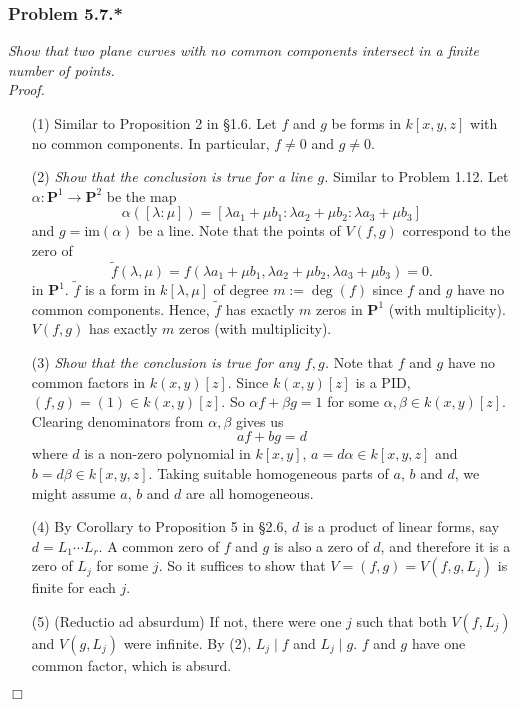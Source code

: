\documentclass{article}
\begin{document}



\subsubsection*{Problem 5.7.*}
\emph{Show that two plane curves with no common components intersect in
a finite number of points.} \\



\emph{Proof.}
\begin{enumerate}
\item[(1)]
  Similar to Proposition 2 in \S 1.6.
  Let $f$ and $g$ be forms in $k[x,y,z]$ with no common components.
  In particular, $f \neq 0$ and $g \neq 0$.

\item[(2)]
  \emph{Show that the conclusion is true for a line $g$.}
  Similar to Problem 1.12.
  Let
  $\alpha: \mathbf{P}^1 \to \mathbf{P}^2$ be the map
  \[
    \alpha([\lambda : \mu]) = [\lambda a_1 + \mu b_1 : \lambda a_2 + \mu b_2 : \lambda a_3 + \mu b_3]
  \]
  and $g = \mathrm{im}(\alpha)$ be a line.
  Note that the points of $V(f, g)$ correspond to the zero of
  \[
    \widetilde{f}(\lambda, \mu)
    = f(\lambda a_1 + \mu b_1, \lambda a_2 + \mu b_2, \lambda a_3 + \mu b_3)
    = 0.
  \]
  in $\mathbf{P}^1$.
  $\widetilde{f}$ is a form in $k[\lambda,\mu]$ of degree $m := \deg(f)$
  since $f$ and $g$ have no common components.
  Hence, $\widetilde{f}$ has exactly $m$ zeros in $\mathbf{P}^1$ (with multiplicity).
  $V(f,g)$ has exactly $m$ zeros (with multiplicity).

\item[(3)]
  \emph{Show that the conclusion is true for any $f, g$.}
  Note that $f$ and $g$ have no common factors in $k(x,y)[z]$.
  Since $k(x,y)[z]$ is a PID, $(f,g) = (1) \in k(x,y)[z]$.
  So $\alpha f + \beta g = 1$ for some $\alpha, \beta \in k(x,y)[z]$.
  Clearing denominators from $\alpha, \beta$ gives us
  \[
    af + bg = d
  \]
  where $d$ is a non-zero polynomial in $k[x,y]$,
  $a = d\alpha \in k[x,y,z]$ and $b = d\beta \in k[x,y,z]$.
  Taking suitable homogeneous parts of $a$, $b$ and $d$,
  we might assume $a$, $b$ and $d$ are all homogeneous.

\item[(4)]
  By Corollary to Proposition 5 in \S 2.6,
  $d$ is a product of linear forms, say $d = L_1 \cdots L_r$.
  A common zero of $f$ and $g$ is also a zero of $d$,
  and therefore it is a zero of $L_j$ for some $j$.
  So it suffices to show that $V = (f,g) = V(f,g,L_j)$ is finite for each $j$.

\item[(5)]
  (Reductio ad absurdum)
  If not, there were one $j$ such that both $V(f,L_j)$ and $V(g,L_j)$ were infinite.
  By (2), $L_j \mid f$ and $L_j \mid g$.
  $f$ and $g$ have one common factor, which is absurd.
\end{enumerate}
$\Box$ \\\\
\end{document}
